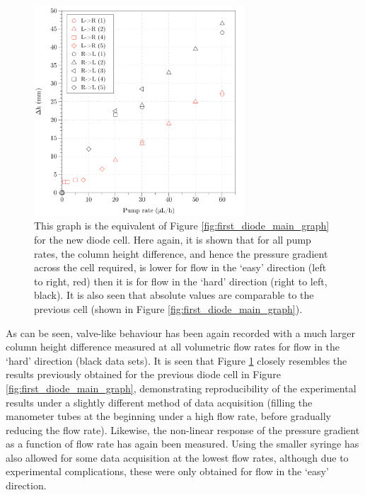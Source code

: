 \begin{figure}
\begin{center}
\includegraphics[width=0.7\textwidth]{Figures/Diode/second_diode/diff}
\end{center}
\caption[Difference in column heights as a function of flow rate for both directions (second diode behaviour)]{\label{fig:second_diode_diff} This graph is the equivalent of Figure \ref{fig:first_diode_main_graph} for the new diode cell. Here again, it is shown that for all pump rates, the column height difference, and hence the pressure gradient across the cell required, is lower for flow in the `easy' direction (left to right, red) then it is for flow in the `hard' direction (right to left, black). It is also seen that absolute values are comparable to the previous cell (shown in Figure \ref{fig:first_diode_main_graph}).}
\end{figure}

As can be seen, valve-like behaviour has been again recorded with a much larger column height difference measured at all volumetric flow rates for flow in the `hard' direction (black data sets). It is seen that Figure \ref{fig:second_diode_diff} closely resembles the results previously obtained for the previous diode cell in Figure \ref{fig:first_diode_main_graph}, demonstrating reproducibility of the experimental results under a slightly different method of data acquisition (filling the manometer tubes at the beginning under a high flow rate, before gradually reducing the flow rate). Likewise, the non-linear response of the pressure gradient as a function of flow rate has again been measured. Using the smaller syringe has also allowed for some data acquisition at the lowest flow rates, although due to experimental complications, these were only obtained for flow in the `easy' direction. 

